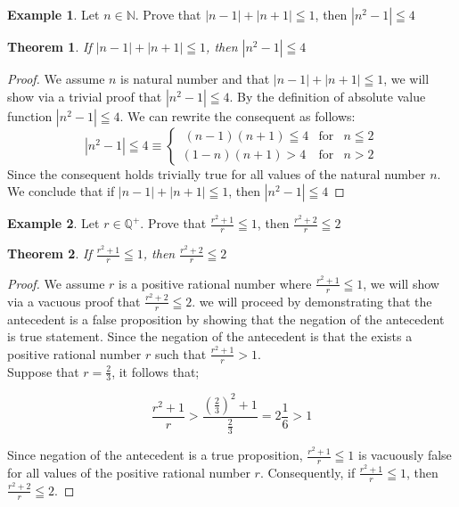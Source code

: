 \documentclass{book}
\newtheorem{theorem}{Theorem}[section]
\theoremstyle{definition}
\newtheorem{example}{Example}[definition]
\theoremstyle{remark}
\newcommand{\bb}[1]{\mathbb{#1}}
\begin{document}
\begin{example}
Let $n \in \bb{N}$. Prove that $|n-1|+|n+1| \leqq 1$, then $|n^2-1| \leqq 4$

\begin{tcolorbox}
	\begin{theorem}
		If $|n-1|+|n+1| \leqq 1$, then $|n^2-1| \leqq 4$
	\end{theorem}
\end{tcolorbox}

\begin{proof}
We assume $n$ is natural number and that $|n-1|+|n+1| \leqq 1$, we will show via a trivial proof that $|n^2-1| \leqq 4$. By the definition of absolute value function $|n^2-1| \leqq 4$. We can rewrite the consequent as follows: 
	\begin{equation}
		|n^2-1| \leqq 4 \equiv \left\{ 
			\begin{array}{rcl}\
				(n-1)(n+1)\leqq 4 & \mbox{for} & n \leqq 2 \\ 
				(1-n)(n+1) > 4 & \mbox{for} & n > 2 
			\end{array} \right.  \nonumber 
	\end{equation}
Since the consequent holds trivially true for all values of the natural number $n$. We conclude that if $|n-1|+|n+1| \leqq 1$, then $|n^2-1| \leqq 4$

\end{proof}
\end{example}


\begin{example}
Let $r \in \mathbb{Q}^+$. Prove that $\frac{r^2 + 1}{r} \leqq 1$, then $\frac{r^2 + 2}{r} \leqq 2$

\begin{tcolorbox}
	\begin{theorem}
		If $\frac{r^2 + 1}{r} \leqq 1$, then $\frac{r^2 + 2}{r} \leqq 2$
	\end{theorem}
\end{tcolorbox}

\begin{proof}
We assume $r$ is a positive rational number where $\frac{r^2 + 1}{r} \leqq 1$, we will show via a vacuous proof that $\frac{r^2 + 2}{r} \leqq 2$. we will proceed by demonstrating that the antecedent is a false proposition by showing that the negation of the antecedent is true statement. Since the negation of the antecedent is that the exists a positive rational number $r$ such that $\frac{r^2 + 1}{r} > 1$. \\ 
Suppose that $r = \frac{2}{3}$, it follows that; 

	\begin{equation}
		\frac{r^2 + 1}{r}>\frac{(\frac{2}{3})^2+1}{\frac{2}{3}} = 2\frac{1}{6}>1 \nonumber 
	\end{equation}

Since negation of the antecedent is a true proposition, $\frac{r^2 + 1}{r} \leqq 1$ is vacuously false for all values of the positive rational number $r$. Consequently, if $\frac{r^2 + 1}{r} \leqq 1$, then $\frac{r^2 + 2}{r} \leqq 2$.
\end{proof}
\end{example}
\end{document}
